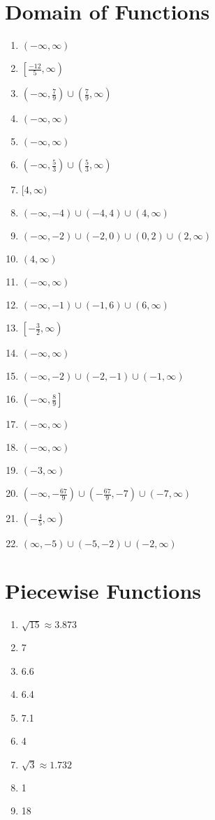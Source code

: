 \section*{Domain of Functions}

\begin{enumerate}
	\item $(-\infty, \infty)$
	\item $\left[\frac{-12}{5}, \infty\right)$
	\item $\left(-\infty, \frac{7}{9}\right) \cup \left(\frac{7}{9}, \infty\right)$
	\item $(-\infty, \infty)$
	\item $(-\infty, \infty)$
	\item $\left(-\infty, \frac{5}{3}\right) \cup \left(\frac{5}{3}, \infty\right)$
	\item $[4, \infty)$
	\item $(-\infty, -4) \cup (-4, 4) \cup (4, \infty)$
	\item $(-\infty, -2) \cup (-2, 0) \cup (0,2) \cup (2, \infty)$
	\item $(4, \infty)$
	\item $(-\infty, \infty)$
	\item $(-\infty, -1) \cup (-1, 6) \cup (6, \infty)$
	\item $\left[-\frac{3}{2}, \infty\right)$
	\item $(-\infty, \infty)$
	\item $(-\infty, -2) \cup (-2,-1) \cup (-1,\infty)$
	\item $\left(-\infty, \frac{8}{9}\right]$
	\item $(-\infty, \infty)$
    \item $(-\infty, \infty)$
    \item $(-3, \infty)$
    \item $\left(-\infty,-\frac{67}{9}\right) \cup \left(-\frac{67}{9},-7\right) \cup (-7,\infty)$
    \item $\left(-\frac{4}{5}, \infty\right)$
    \item $(\infty,-5) \cup (-5,-2) \cup (-2,\infty)$
\end{enumerate}

\section*{Piecewise Functions}
\begin{enumerate}
    \item $\sqrt{15} \approx 3.873$
    \item 7
    \item 6.6
    \item 6.4
    \item 7.1
	\item 4
    \item $\sqrt{3} \approx 1.732$
    \item 1
    \item 18
\end{enumerate}